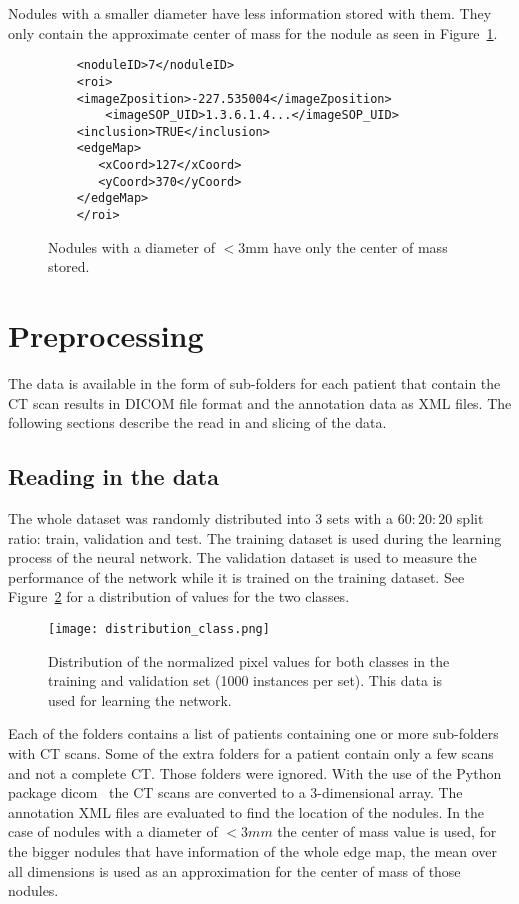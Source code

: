 \documentclass[../Thesis.tex]{subfiles}
\begin{document}
Nodules with a smaller diameter have less information stored with them. They only contain the approximate center of mass for the nodule as seen in Figure~\ref{fig:smallNod}.

\begin{figure}
\begin{lstlisting}
	<noduleID>7</noduleID>
	<roi>
	<imageZposition>-227.535004</imageZposition>
        <imageSOP_UID>1.3.6.1.4...</imageSOP_UID>
	<inclusion>TRUE</inclusion>
	<edgeMap>
	   <xCoord>127</xCoord>
	   <yCoord>370</yCoord>
	</edgeMap>
	</roi>
\end{lstlisting}
\caption{Nodules with a diameter of $<3$mm have only the center of mass stored.}
\label{fig:smallNod}
\end{figure}

\section{Preprocessing}
The data is available in the form of sub-folders for each patient that contain the CT scan results in DICOM file format and the annotation data as XML files. The following sections describe the read in and slicing of the data.

\subsection{Reading in the data}
The whole dataset was randomly distributed into 3 sets with a $60:20:20$ split ratio: train, validation and test. The training dataset is used during the learning process of the neural network. The validation dataset is used to measure the performance of the network while it is trained on the training dataset. See Figure~\ref{fig:ttdist} for a distribution of values for the two classes.
 
\begin{figure}
\texttt{[image: distribution\_class.png]}
\caption{Distribution of the normalized pixel values for both classes in the training and validation set (1000 instances per set). This data is used for learning the network.}
\label{fig:ttdist}
\end{figure}

Each of the folders contains a list of patients containing one or more sub-folders with CT scans. Some of the extra folders for a patient contain only a few scans and not a complete CT. Those folders were ignored. With the use of the Python package dicom~\cite{mason2011t} the CT scans are converted to a 3-dimensional array. The annotation XML files are evaluated to find the location of the nodules. In the case of nodules with a diameter of $<3mm$ the center of mass value is used, for the bigger nodules that have information of the whole edge map, the mean over all dimensions is used as an approximation for the center of mass of those nodules. 
\end{document}
